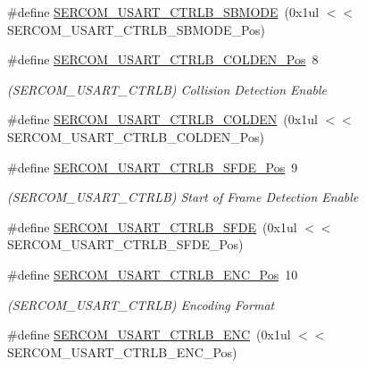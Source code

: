 \begin{DoxyCompactItemize}
\#define \mbox{\hyperlink{group___s_a_m_d21___s_e_r_c_o_m_gae1962e954c94eff0571efb02fe20c328}{S\+E\+R\+C\+O\+M\+\_\+\+U\+S\+A\+R\+T\+\_\+\+C\+T\+R\+L\+B\+\_\+\+S\+B\+M\+O\+DE}}~(0x1ul $<$$<$ S\+E\+R\+C\+O\+M\+\_\+\+U\+S\+A\+R\+T\+\_\+\+C\+T\+R\+L\+B\+\_\+\+S\+B\+M\+O\+D\+E\+\_\+\+Pos)
\item 
\#define \mbox{\hyperlink{group___s_a_m_d21___s_e_r_c_o_m_ga170496bb8307464e02214c3e103e2184}{S\+E\+R\+C\+O\+M\+\_\+\+U\+S\+A\+R\+T\+\_\+\+C\+T\+R\+L\+B\+\_\+\+C\+O\+L\+D\+E\+N\+\_\+\+Pos}}~8
\begin{DoxyCompactList}\small\item\em (S\+E\+R\+C\+O\+M\+\_\+\+U\+S\+A\+R\+T\+\_\+\+C\+T\+R\+LB) Collision Detection Enable \end{DoxyCompactList}\item 
\#define \mbox{\hyperlink{group___s_a_m_d21___s_e_r_c_o_m_ga9a6695251cc033ef98b7bf40bf00f6a1}{S\+E\+R\+C\+O\+M\+\_\+\+U\+S\+A\+R\+T\+\_\+\+C\+T\+R\+L\+B\+\_\+\+C\+O\+L\+D\+EN}}~(0x1ul $<$$<$ S\+E\+R\+C\+O\+M\+\_\+\+U\+S\+A\+R\+T\+\_\+\+C\+T\+R\+L\+B\+\_\+\+C\+O\+L\+D\+E\+N\+\_\+\+Pos)
\item 
\#define \mbox{\hyperlink{group___s_a_m_d21___s_e_r_c_o_m_ga5b0e8936c3d3be3ccc62eadbbc21df69}{S\+E\+R\+C\+O\+M\+\_\+\+U\+S\+A\+R\+T\+\_\+\+C\+T\+R\+L\+B\+\_\+\+S\+F\+D\+E\+\_\+\+Pos}}~9
\begin{DoxyCompactList}\small\item\em (S\+E\+R\+C\+O\+M\+\_\+\+U\+S\+A\+R\+T\+\_\+\+C\+T\+R\+LB) Start of Frame Detection Enable \end{DoxyCompactList}\item 
\#define \mbox{\hyperlink{group___s_a_m_d21___s_e_r_c_o_m_ga6664bd58a6a47b14f50982b33407e52d}{S\+E\+R\+C\+O\+M\+\_\+\+U\+S\+A\+R\+T\+\_\+\+C\+T\+R\+L\+B\+\_\+\+S\+F\+DE}}~(0x1ul $<$$<$ S\+E\+R\+C\+O\+M\+\_\+\+U\+S\+A\+R\+T\+\_\+\+C\+T\+R\+L\+B\+\_\+\+S\+F\+D\+E\+\_\+\+Pos)
\item 
\#define \mbox{\hyperlink{group___s_a_m_d21___s_e_r_c_o_m_ga45df1ea385a685b6585ebc5940d40f65}{S\+E\+R\+C\+O\+M\+\_\+\+U\+S\+A\+R\+T\+\_\+\+C\+T\+R\+L\+B\+\_\+\+E\+N\+C\+\_\+\+Pos}}~10
\begin{DoxyCompactList}\small\item\em (S\+E\+R\+C\+O\+M\+\_\+\+U\+S\+A\+R\+T\+\_\+\+C\+T\+R\+LB) Encoding Format \end{DoxyCompactList}\item 
\#define \mbox{\hyperlink{group___s_a_m_d21___s_e_r_c_o_m_ga1bef37fed9555aa34ab051cc9ab7b0b7}{S\+E\+R\+C\+O\+M\+\_\+\+U\+S\+A\+R\+T\+\_\+\+C\+T\+R\+L\+B\+\_\+\+E\+NC}}~(0x1ul $<$$<$ S\+E\+R\+C\+O\+M\+\_\+\+U\+S\+A\+R\+T\+\_\+\+C\+T\+R\+L\+B\+\_\+\+E\+N\+C\+\_\+\+Pos)

\end{DoxyCompactItemize}

